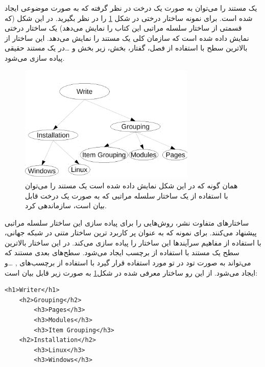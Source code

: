 یک مستند را می‌توان به صورت یک درخت در نظر گرفته که به صورت موضوعی ایجاد شده
است. برای نمونه ساختار درختی در شکل 
\ref{images/write/grouping/section-tree} را در نظر بگیرید. در این شکل (که قسمتی
از ساختار سلسله مراتبی این کتاب را نمایش می‌دهد) یک ساختار درختی نمایش داده شده
است که سازمان کلی یک مستند را نمایش می‌دهد. این ساختار از بالاترین سطح با
استفاده از فصل، گفتار، بخش، زیر بخش  و \ldots در یک مستند حقیقی پیاده سازی
می‌شود.

\begin{figure}
	\centering
	\includegraphics[width=0.75\textwidth]{images/write/grouping/section-tree}
	\caption[ساختار سلسله مراتبی یک مستند]{
		همان گونه که در این شکل نمایش داده شده است یک مستند را می‌توان با استفاده
		از یک ساختار سلسله مراتبی که به صورت یک درخت قابل بیان است، سازماندهی کرد.
	}
	\label{images/write/grouping/section-tree}
\end{figure}

ساختارهای متفاوت نشر، روش‌هایی را برای پیاده سازی این ساختار سلسله مراتبی
پیشنهاد می‌کنند. برای نمونه  که به عنوان پر کاربرد ترین ساختار متنی در
شبکه جهانی، با استفاده از مفاهیم سرآیندها این ساختار را پیاده سازی می‌کند. در
این ساختار بالاترین سطح یک مستند با استفاده از برچسب  ایجاد
می‌شود. سطح‌های بعدی مستند که می‌تواند به صورت تود در تو مورد استفاده قرار گیرد
با استفاده از برچسب‌های , \ldots و 
ایجاد می‌شود. از این رو ساختار معرفی شده در
شکل\ref{images/write/grouping/section-tree} به صورت زیر قابل بیان است:

\begin{latin}
\lstset{language=HTML}  
\begin{lstlisting}[frame=single] 
<h1>Writer</h1>
	<h2>Grouping</h2>
		<h3>Pages</h3>
		<h3>Modules</h3>
		<h3>Item Grouping</h3>
	<h2>Installation</h2>
		<h3>Linux</h3>
		<h3>Windows</h3>
\end{lstlisting}
\end{latin}

